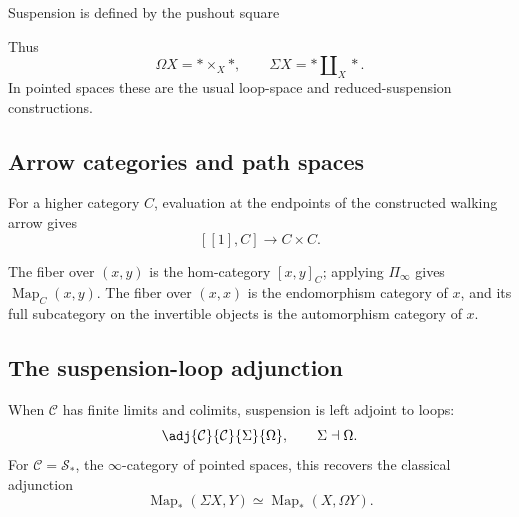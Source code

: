 \documentclass{amsart}
\begin{document}
Suspension is defined by the pushout square

\begin{Shaded}
\begin{Highlighting}[]
\NormalTok{\{}\NormalTok{\}}
  \NormalTok{[r,"0"]}
  \NormalTok{[d,"0"\textquotesingle{}]}
  \NormalTok{[dr,phantom,very near end,"}\NormalTok{"] \&}
\NormalTok{* }\NormalTok{[d,"j\_1"]}\FunctionTok{\textbackslash{}\textbackslash{}}
\NormalTok{* }\NormalTok{[r,"j\_2"\textquotesingle{}] \& }
\NormalTok{\{}\NormalTok{\}}
\end{Highlighting}
\end{Shaded}

Thus \[
\Omega X=*\times_X *,
\qquad
\Sigma X=*\amalg_X *.
\] In pointed spaces these are the usual loop-space and
reduced-suspension constructions.

\subsection{Arrow categories and path
spaces}\label{sec-interval-presentations}

For a higher category \(C\), evaluation at the endpoints of the
constructed walking arrow gives \[
[[1],C]\longrightarrow C\times C.
\]

The fiber over \((x,y)\) is the hom-category \([x,y]_C\); applying
\(\Pi_\infty\) gives \(\operatorname{Map}_C(x,y)\). The fiber over
\((x,x)\) is the endomorphism category of \(x\), and its full
subcategory on the invertible objects is the automorphism category of
\(x\).

\subsection{The suspension-loop adjunction}\label{sec-adjunctions}

When \(\mathcal C\) has finite limits and colimits, suspension is left
adjoint to loops: \[
\adj{\mathcal C}{\mathcal C}{\Sigma}{\Omega},
\qquad \Sigma\dashv\Omega.
\] For \(\mathcal C=\mathcal S_*\), the \(\infty\)-category of pointed
spaces, this recovers the classical adjunction \[
\operatorname{Map}_*(\Sigma X,Y)\simeq
\operatorname{Map}_*(X,\Omega Y).
\]
\end{document}
